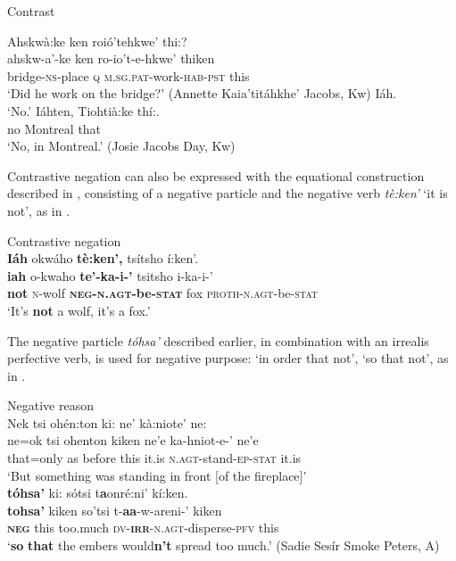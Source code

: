 \documentclass[output=paper,colorlinks,citecolor=brown]{langscibook}
\begin{document}
{\ea\label{ex:moh:99}Contrast\\
\begin{xlist}[AKJ:]
    \label{ex:moh:99a}
        \glll Ahskwà:ke ken roió’tehkwe’ thi:? \\
             ahskw-a’-ke ken ro-io’t-e-hkwe’ thiken \\
             bridge-\textsc{ns-}place \textsc{q} \textsc{m.sg.pat}-work-\textsc{hab-pst} this\\
        \glt ‘Did he work on the bridge?’ (Annette Kaia’titáhkhe’ Jacobs, Kw)
    \label{ex:moh:99b}\medskip
        \gl Iáh.  \\
        \glt ‘No.’ 
    \exi{}\label{ex:moh:99c}\medskip
        \gll Iáhten, Tiohtià:ke thí:. \\
             no Montreal that\\
        \glt ‘No, in Montreal.’ (Josie Jacobs Day, Kw)
\end{xlist}
\z}

Contrastive negation can also be expressed with the equational construction described in , consisting of a negative particle and the negative verb \textit{tè:ken’} ‘it is not’, as in .

\ea\label{ex:moh:100}Contrastive negation\\
    \glll \textbf{Iáh} okwáho \textbf{tè:ken’,} tsítsho í:ken’. \\
         \textbf{iah} o-kwaho \textbf{te’-ka-i-’} tsitsho i-ka-i-’ \\
         \textbf{not} \textsc{n}-wolf \textbf{\textsc{neg-n.agt-}be-\textsc{stat}} fox \textsc{proth-n.agt}-be-\textsc{stat} \\
    \glt  ‘It’s \textbf{not} a wolf, it’s a fox.’
\z 

The negative particle \textit{tóhsa’} described earlier, in combination with an irrealis perfective verb, is used for negative purpose: ‘in order that not’, ‘so that not’, as in .

\ea\label{ex:moh:101}Negative reason\\
    \glll Nek tsi ohén:ton ki: ne’ kà:niote’ ne: \\ 
         ne=ok tsi ohenton kiken ne’e ka-hniot-e-’ ne’e \\ 
         that=only as before this it.is \textsc{n.agt}-stand-\textsc{ep-stat} it.is \\
    \glt ‘But something was standing in front [of the fireplace]’\\ \medskip
    \glll  \textbf{tóhsa’} ki: sótsi t\textbf{a}onré:ni’ kí:ken. \\ 
          \textbf{tohsa’} kiken so’tsi t-\textbf{aa}-w-areni-’ kiken \\
          \textbf{\textsc{neg}} this too.much \textsc{dv-}\textbf{\textsc{irr}}\textsc{-n.agt}-disperse-\textsc{pfv} this\\
    \glt  ‘\textbf{so} \textbf{that} the embers would\textbf{n’t} spread too much.’ (Sadie Sesír Smoke Peters, A)
\z 
\end{document}
